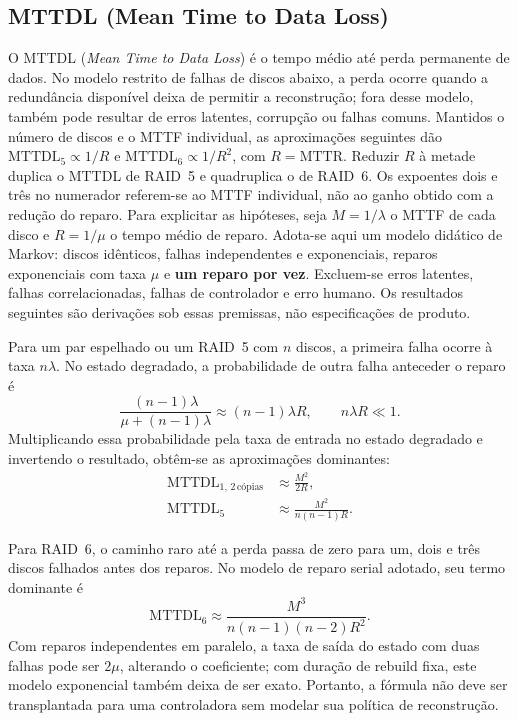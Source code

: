 \documentclass[titlepage]{article}
\begin{document}
\subsection{MTTDL (Mean Time to Data Loss)}
O MTTDL (\textit{Mean Time to Data Loss}) é o tempo médio até perda permanente de dados. No modelo restrito de falhas de discos abaixo, a perda ocorre quando a redundância disponível deixa de permitir a reconstrução; fora desse modelo, também pode resultar de erros latentes, corrupção ou falhas comuns. Mantidos o número de discos e o MTTF individual, as aproximações seguintes dão $\mathrm{MTTDL}_5\propto1/R$ e $\mathrm{MTTDL}_6\propto1/R^2$, com $R=\mathrm{MTTR}$. Reduzir $R$ à metade duplica o MTTDL de RAID~5 e quadruplica o de RAID~6. Os expoentes dois e três no numerador referem-se ao MTTF individual, não ao ganho obtido com a redução do reparo. Para explicitar as hipóteses, seja $M=1/\lambda$ o MTTF de cada disco e $R=1/\mu$ o tempo médio de reparo. Adota-se aqui um modelo didático de Markov: discos idênticos, falhas independentes e exponenciais, reparos exponenciais com taxa $\mu$ e \textbf{um reparo por vez}. Excluem-se erros latentes, falhas correlacionadas, falhas de controlador e erro humano. Os resultados seguintes são derivações sob essas premissas, não especificações de produto.

Para um par espelhado ou um RAID~5 com $n$ discos, a primeira falha ocorre à taxa $n\lambda$. No estado degradado, a probabilidade de outra falha anteceder o reparo é
\[
\frac{(n-1)\lambda}{\mu+(n-1)\lambda}
\approx(n-1)\lambda R,
\qquad n\lambda R\ll1.
\]
Multiplicando essa probabilidade pela taxa de entrada no estado degradado e invertendo o resultado, obtêm-se as aproximações dominantes:
\begin{align}
\mathrm{MTTDL}_{1,\,2\,\text{cópias}}&\approx\frac{M^2}{2R},\label{eq:mttdl_raid1}\\
\mathrm{MTTDL}_{5}&\approx\frac{M^2}{n(n-1)R}.\label{eq:mttdl_raid5}
\end{align}

Para RAID~6, o caminho raro até a perda passa de zero para um, dois e três discos falhados antes dos reparos. No modelo de reparo serial adotado, seu termo dominante é
\begin{equation}
\mathrm{MTTDL}_{6}\approx\frac{M^3}{n(n-1)(n-2)R^2}.
\label{eq:mttdl_raid6}
\end{equation}
Com reparos independentes em paralelo, a taxa de saída do estado com duas falhas pode ser $2\mu$, alterando o coeficiente; com duração de rebuild fixa, este modelo exponencial também deixa de ser exato. Portanto, a fórmula não deve ser transplantada para uma controladora sem modelar sua política de reconstrução.
\end{document}
